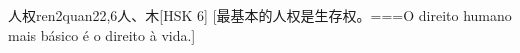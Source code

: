 \begin{EntryWithPhonetic}{人权}{ren2quan2}{2,6}{⼈、⽊}[HSK 6]
  [最基本的人权是生存权。===O direito humano mais básico é o direito à vida.]
\end{EntryWithPhonetic}

